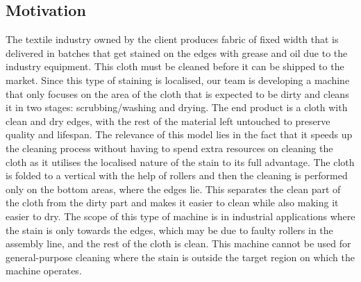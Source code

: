 \documentclass[table,french,english]{rapportCS}
\begin{document}
\newpage
\begin{center}
\section*{\centering Motivation}\label{sec:motivation}
The textile industry owned by the client produces fabric of fixed width that is delivered in batches that get stained on the edges with grease and oil due to the industry equipment. This cloth must be cleaned before it can be shipped to the market. Since this type of staining is localised, our team is developing a machine that only focuses on the area of the cloth that is expected to be dirty and cleans it in two stages: scrubbing/washing and drying. The end product is a cloth with clean and dry edges, with the rest of the material left untouched to preserve quality and lifespan. The relevance of this model lies in the fact that it speeds up the cleaning process without having to spend extra resources on cleaning the cloth as it utilises the localised nature of the stain to its full advantage. The cloth is folded to a vertical  with the help of rollers and then the cleaning is performed only on the bottom areas, where the edges lie. This separates the clean part of the cloth from the dirty part and makes it easier to clean while also making it easier to dry. The scope of this type of machine is in industrial applications where the stain is only towards the edges, which may be due to faulty rollers in the assembly line, and the rest of the cloth is clean. This machine cannot be used for general-purpose cleaning where the stain is outside the target region on which the machine operates.

\end{center}
\newpage

\renewcommand{\contentsname}{Table of contents}\label{sec:toc}
\toc
\newpage

\newpage
\newpage



\newpage


\newpage
\setcounter{figure}{0}
\end{document}
